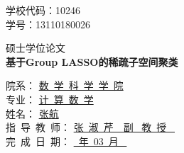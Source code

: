 \documentclass[main]{subfiles}
\begin{document}
\pagestyle{empty}

\begin{flushright}
  {  学校代码：10246{\ \ \ \ \ \ \ \ \ \ \ }\\
  学{\hspace{18pt}}号：13110180026}
\end{flushright}
\vspace{4mm}

\begin{center}
\end{center}
\vspace{4mm}

\begin{center}
  { 硕\quad 士\quad 学\quad 位\quad 论\quad 文}\\
\vspace{2.5cm}
{ \textbf{基于Group LASSO的稀疏子空间聚类}}\\
\vspace{1cm}
\end{center}
\vspace{2cm}

\begin{center}
  {
  院{\hspace{39pt}}系： \underline{\qquad 数\ 学\ 科\ 学\ 学\ 院 \qquad }\\
  \vspace{4mm}
  专{\hspace{39pt}}业： \underline{\qquad\quad 计\ 算\ 数\ 学 \qquad\qquad }\\
  \vspace{4mm}
  姓{\hspace{39pt}}名： \underline{\qquad\qquad 张\qquad 航\qquad\qquad }\\
  \vspace{4mm}
  指\ 导\ 教\ 师： \underline{\qquad 张\ 淑\ 芹\ \ 副 \ 教\ 授 \qquad\ }\\
  \vspace{4mm}
  完\ 成\ 日\ 期： \underline{\qquad{}\ 年\ 03\ 月 \quad\qquad\ }}
\end{center}


%
\end{document}
